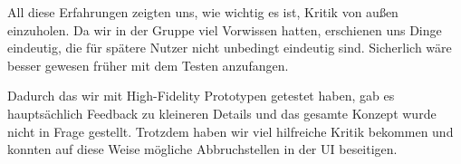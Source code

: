 	All diese Erfahrungen zeigten uns, wie wichtig es ist, Kritik von außen einzuholen. Da wir in der Gruppe viel Vorwissen hatten, erschienen uns Dinge eindeutig, die für spätere Nutzer nicht unbedingt eindeutig sind.
Sicherlich wäre besser gewesen früher mit dem Testen anzufangen.

	Dadurch das wir mit High-Fidelity Prototypen getestet haben, gab es hauptsächlich Feedback zu kleineren Details und das gesamte Konzept wurde nicht in Frage gestellt. Trotzdem haben wir viel hilfreiche Kritik bekommen und konnten auf diese Weise mögliche Abbruchstellen in der UI beseitigen.
